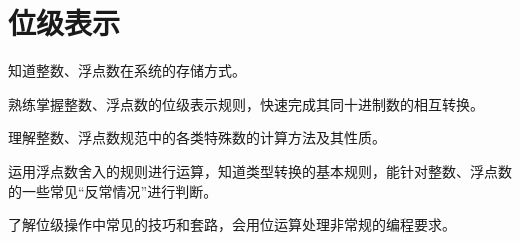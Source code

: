 \chapter{位级表示}
	\begin{summary}
		\begin{compactitem}
			\item 知道整数、浮点数在系统的存储方式。
			\item 熟练掌握整数、浮点数的位级表示规则，快速完成其同十进制数的相互转换。
			\item 理解整数、浮点数规范中的各类特殊数的计算方法及其性质。
			\item 运用浮点数舍入的规则进行运算，知道类型转换的基本规则，能针对整数、浮点数的一些常见“反常情况”进行判断。
			\item *了解位级操作中常见的技巧和套路，会用位运算处理非常规的编程要求。
		\end{compactitem}
	\end{summary}

